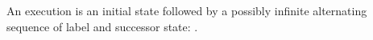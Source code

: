 \begin{definition}[Execution]
  \label{def:exec}
  \leanok
  An execution is an initial state followed by a possibly infinite alternating sequence of label and successor state: .
\end{definition}
